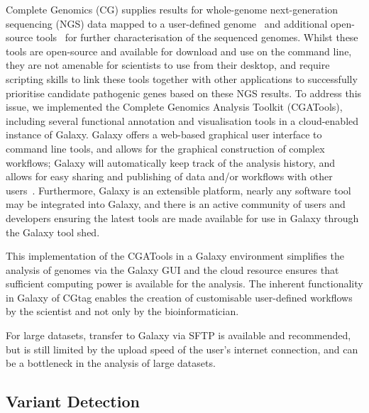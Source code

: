 Complete Genomics (CG) supplies results for whole-genome next-generation sequencing (NGS) data mapped to a user-defined genome~\cite{ma} and additional open-source tools~\cite{url-cgatools} for further characterisation of the sequenced genomes. Whilst these tools are open-source and available for download and use on the command line, they are not amenable for scientists to use from their desktop, and require scripting skills to link these tools together with other applications to successfully prioritise candidate pathogenic genes based on these NGS results. To address this issue, we implemented the Complete Genomics Analysis Toolkit (CGATools), including several functional annotation and visualisation tools in a cloud-enabled instance of Galaxy. Galaxy offers a web-based graphical user interface to command line tools, and allows for the graphical construction of complex workflows; Galaxy will automatically keep track of the analysis history, and allows for easy sharing and publishing of data and/or workflows with other users~\cite{goecks2010galaxy, blankenberg2010galaxy2, giardine2005galaxy}. Furthermore, Galaxy is an extensible platform, nearly any software tool may be integrated into Galaxy, and there is an active community of users and developers ensuring the latest tools are made available for use in Galaxy through the Galaxy tool shed.

This implementation of the CGATools in a Galaxy environment simplifies the analysis of genomes via the Galaxy GUI and the cloud resource ensures that sufficient computing power is available for the analysis. The inherent functionality in Galaxy of CGtag enables the creation of customisable user-defined workflows by the scientist and not only by the bioinformatician.

For large datasets, transfer to Galaxy via SFTP is available and recommended, but is still limited by the upload speed of the user’s internet connection, and can be a bottleneck in the analysis of large datasets.


\subsection*{Variant Detection}

